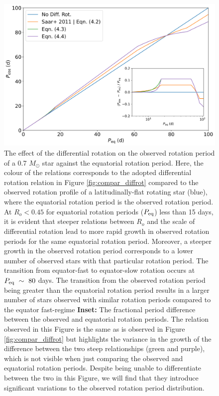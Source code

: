 \begin{figure}
\centering
 \includegraphics[width=\textwidth]{Figures/rot_gap_figures/comparison_observed_rot_periods.png}
 \caption[The effect of the differential rotation on the observed rotation period of a 0.7 $M_{\odot}$ against equatorial rotation period.]{
 	The effect of the differential rotation on the observed rotation period of a 0.7 $M_{\odot}$ star against the equatorial rotation period. Here, the colour of the relations corresponds to the adopted differential rotation relation in Figure \ref{fig:compar_diffrot} compared to the observed rotation profile of a latitudinally-flat rotating star (blue), where the equatorial rotation period is the observed rotation period. At $R_o<0.45$ for equatorial rotation periods ($P_{\rm{eq}}$) less than 15 days, it is evident that steeper relations between $R_o$ and the scale of differential rotation lead to more rapid growth in observed rotation periods for the same equatorial rotation period. Moreover, a steeper growth in the observed rotation period corresponds to a lower number of observed stars with that particular rotation period. The transition from equator-fast to equator-slow rotation occurs at $P_{\rm{eq}} \ \sim \ 80$ days. The transition from the observed rotation period being greater than the equatorial rotation period results in a larger number of stars observed with similar rotation periods compared to the equator fast-regime \textbf{Inset:} The fractional period difference between the observed and equatorial rotation periods. The relation observed in this Figure is the same as is observed in Figure \ref{fig:compar_diffrot} but highlights the variance in the growth of the difference between the two steep relationships (green and purple), which is not visible when just comparing the observed and equatorial rotation periods. Despite being unable to differentiate between the two in this Figure, we will find that they introduce significant variations to the observed rotation period distribution.}
 \label{fig:comp_per}
\end{figure}

